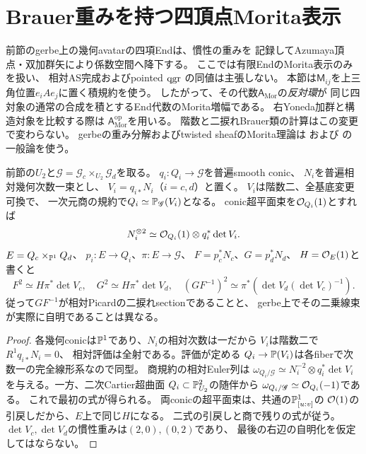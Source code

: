 \section{Brauer重みを持つ四頂点Morita表示}
\label{sec:qa-twisted-morita-weights}
前節のgerbe上の幾何avatarの四項Endは、慣性の重みを
記録してAzumaya頂点・双加群矢により係数空間へ降下する。
ここでは有限EndのMorita表示のみを扱い、
相対AS完成およびpointed $\operatorname{qgr}$ の同値は主張しない。
本節は$\mathsf M_{ij}$を上三角位置$e_iAe_j$に置く積規約を使う。
したがって、その代数$\mathsf A_{\mathrm{Mor}}$の\emph{反対環}が
同じ四対象の通常の合成を積とするEnd代数のMorita増幅である。
右Yoneda加群と構造対象を比較する際は
$\mathsf A_{\mathrm{Mor}}^{\mathrm{op}}$を用いる。
階数と二捩れBrauer類の計算はこの変更で変わらない。
gerbeの重み分解およびtwisted sheafのMorita理論は
\cite[Theorems~4.7 and 5.4]{BerghSchnurer2021}
および\cite[Theorem~6.2 and Remark~6.3]{BerghSchnurer2021}
の一般論を使う。

\begin{lemma}
\label{lem:qa-morita-determinant-normalization}
前節の$U_2$と$\mathscr G=\mathscr G_c\times_{U_2}\mathscr G_d$を取る。
$q_i:Q_i\to\mathscr G$を普遍smooth conic、
$N_i$を普遍相対幾何次数一束とし、
$V_i=q_{i*}N_i$（$i=c,d$）と置く。
$V_i$は階数二、全基底変更可換で、
一次元商の規約で$Q_i\simeq\mathbb P_{\mathscr G}(V_i)$となる。
conic超平面束を$\mathcal O_{Q_i}(1)$とすれば
\begin{equation}
 N_i^{\otimes2}\simeq
 \mathcal O_{Q_i}(1)\otimes q_i^*\det V_i .
 \label{eq:qa-morita-determinant-square}
\end{equation}
$E=Q_c\times_{\mathbb P^1}Q_d$、
$p_i:E\to Q_i$、$\pi:E\to\mathscr G$、
$F=p_c^*N_c$、$G=p_d^*N_d$、
$H=\mathcal O_E(1)$と書くと
\begin{equation}
 F^2\simeq H\pi^*\det V_c,\quad
 G^2\simeq H\pi^*\det V_d,\quad
 (GF^{-1})^2\simeq\pi^*(\det V_d(\det V_c)^{-1}).
 \label{eq:qa-morita-fg-square}
\end{equation}
従って$GF^{-1}$が相対Picardの二捩れsectionであることと、
gerbe上でその二乗線束が実際に自明であることは異なる。
\end{lemma}
\begin{proof}
各幾何conicは$\mathbb P^1$であり、$N_i$の相対次数は一だから
$V_i$は階数二で$R^1q_{i*}N_i=0$、
相対評価は全射である。評価が定める
$Q_i\to\mathbb P(V_i)$は各fiberで次数一の完全線形系なので同型。
商規約の相対Euler列は
$\omega_{Q_i/\mathscr G}\simeq N_i^{-2}\otimes q_i^*\det V_i$
を与える。一方、二次Cartier超曲面
$Q_i\subset\mathbb P^2_{U_2}$の随伴から
$\omega_{Q_i/\mathscr G}\simeq\mathcal O_{Q_i}(-1)$である。
これで最初の式が得られる。
両conicの超平面束は、共通の$\mathbb P^1_{[u:v]}$の
$\mathcal O(1)$の引戻しだから、$E$上で同じ$H$になる。
二式の引戻しと商で残りの式が従う。
$\det V_c,\det V_d$の慣性重みは$(2,0),(0,2)$であり、
最後の右辺の自明化を仮定してはならない。
\end{proof}

